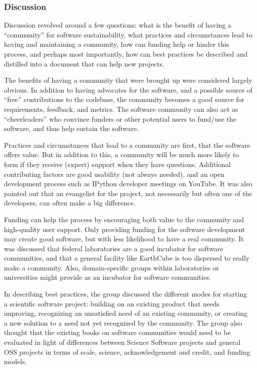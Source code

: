 \subsubsection{Discussion}

Discussion revolved around a few questions: what is the benefit of having a
``community'' for software sustainability, what practices and circumstances lead
to having and maintaining a community, how can funding help or hinder this
process, and perhaps most importantly, how can best practices be described and
distilled into a document that can help new projects.

The benefits of having a community that were brought up were considered largely
obvious. In addition to having advocates for the software, and a possible source
of ``free'' contributions to the codebase, the community becomes a good source
for requirements, feedback, and metrics. The software community can also act as
``cheerleaders'' who convince funders or other potential users to fund/use the
software, and thus help sustain the software.

Practices and circumstances that lead to a community are first, that the
software offers value. But in addition to this, a community will be much more
likely to form if they receive (expert) support when they have questions.
Additional contributing factors are good usability (not always needed), and an
open development process such as IPython developer meetings on YouTube. It was
also pointed out that an evangelist for the project, not necessarily but often
one of the developers, can often make a big difference.

Funding can help the process by encouraging both value to the community and
high-quality user support. Only providing funding for the software development
may create good software, but with less likelihood to have a real community. It
was discussed that federal laboratories are a good incubator for software
communities, and that a general facility like EarthCube is too dispersed to
really make a community. Also, domain-specific groups within laboratories or
universities might provide as an incubator for software communities.

In describing best practices, the group discussed the different modes for
starting a scientific software project: building on an existing product that
needs improving, recognizing an unsatisfied need of an existing community, or
creating a new solution to a need not yet recognized by the community. The group
also thought that the existing books on software communities would need to be
evaluated in light of differences between Science Software projects and general
OSS projects in terms of scale, science, acknowledgement and credit, and funding
models.

